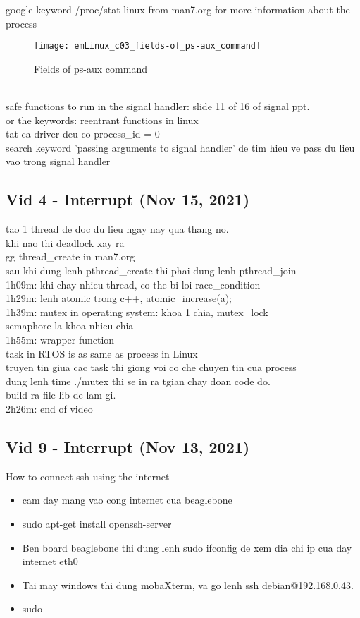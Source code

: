 google keyword /proc/stat linux from man7.org for more information about the process
\begin{figure}[h]
  \texttt{[image: emLinux\_c03\_fields-of\_ps-aux\_command]}
  \caption{Fields of ps-aux command}  
\end{figure}
\\safe functions to run in the signal handler: slide 11 of 16 of signal ppt.
\\or the keywords: reentrant functions in linux
\\tat ca driver deu co process\_id = 0
\\search keyword 'passing arguments to signal handler' de tim hieu ve pass du lieu vao trong signal handler

\subsection{Vid 4 - Interrupt (Nov 15, 2021)}
tao 1 thread de doc du lieu ngay nay qua thang no.
\\khi nao thi deadlock xay ra
\\gg thread\_create in man7.org
\\sau khi dung lenh pthread\_create thi phai dung lenh pthread\_join
\\1h09m: khi chay nhieu thread, co the bi loi race\_condition
\\1h29m: lenh atomic trong c++, atomic\_increase(a);
\\1h39m: mutex in operating system: khoa 1 chia, mutex\_lock
\\semaphore la khoa nhieu chia
\\1h55m: wrapper function
\\task in RTOS is as same as process in Linux
\\truyen tin giua cac task thi giong voi co che chuyen tin cua process
\\dung lenh time ./mutex thi se in ra tgian chay doan code do.
\\build ra file lib de lam gi.
\\2h26m: end of video




\subsection{Vid 9 - Interrupt (Nov 13, 2021)}

How to connect ssh using the internet
\begin{itemize} 
  \item cam day mang vao cong internet cua beaglebone
  \item sudo apt-get install openssh-server
  \item Ben board beaglebone thi dung lenh sudo ifconfig de xem dia chi ip cua day internet eth0
  \item Tai may windows thi dung mobaXterm, va go lenh ssh debian@192.168.0.43.
  \item sudo 
\end{itemize}


